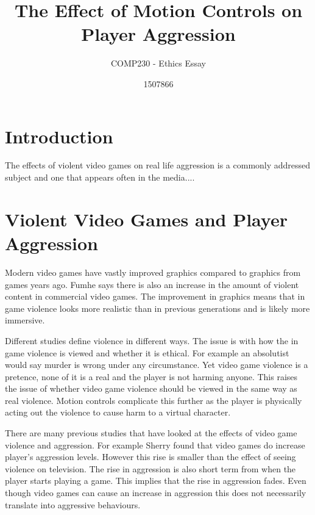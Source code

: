 \documentclass{scrartcl}
\title{The Effect of Motion Controls on Player Aggression }
\subtitle{COMP230 - Ethics Essay}
\author{1507866}
\begin{document}
	
\maketitle
	
	
\section{Introduction}
The effects of violent video games on real life aggression is a commonly addressed subject and one that appears often in the media....


\section{Violent Video Games and Player Aggression}
 
Modern video games have vastly improved graphics compared to graphics from games years ago. Fumhe says there is also an increase in the amount of violent content in commercial video games. \cite{Fumhe} The improvement in graphics means that in game violence looks more realistic than in previous generations and is likely more immersive. 

\bigskip
Different studies define violence in different ways. The issue is with how the in game violence is viewed and whether it is ethical. For example an absolutist would say murder is wrong under any circumstance. \cite{forsyth}
Yet video game violence is a pretence, none of it is a real and the player is not harming anyone. \cite{Tavinor}
This raises the issue of whether video game violence should be viewed in the same way as real violence. Motion controls complicate this further as the player is physically acting out the violence to cause harm to a virtual character. 

\bigskip
There are many previous studies that have looked at the effects of video game violence and aggression. For example Sherry found that video games do increase player's aggression levels. However this rise is smaller than the effect of seeing violence on television.  \cite{sherry2001effects}
The rise in aggression is also short term from when the player starts playing a game. This implies that the rise in aggression fades. Even though video games can cause an increase in aggression this does not necessarily translate into aggressive behaviours.  \cite{Ferguson}  
\end{document}
